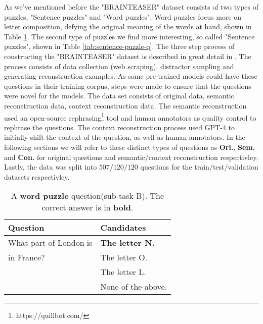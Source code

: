 As we've mentioned before the "BRAINTEASER" dataset consists of two types of puzzles, "Sentence puzzles"
and "Word puzzles".  Word puzzles focus more on letter composition, defying the original meaning
of the words at hand, shown in Table \ref{tab:word-puzzle-q}.
The second type of puzzles we find more interesting, so called "Sentence puzzles", shown in Table
\ref{tab:sentence-puzzle-q}. The three step process of constructing the "BRAINTEASER" dataset
is described in great detail in \citep{semeval}. The process consists of data collection
(web scraping),
distractor sampling and generating reconstruction examples. As some pre-trained models could have
these questions in their training corpus, steps were made to ensure that the questions were novel
for the models.  The data set consists of original data, semantic reconstruction data, context
reconstruction data. The semantic reconstruction used an open-source rephrasing\footnote[2]{https://quillbot.com/} tool and
human annotators as quality control to rephrase the questions. The context reconstruction process
used GPT-4 to initially shift the context of the question, as well as human annotators. In the
following sections we will refer to these distinct types of questions as \textbf{Ori.},
\textbf{Sem.} and
\textbf{Con.} for original questions and semantic/context reconstruction respectivley. Lastly, the
data was split into $507/120/120$ questions for the train/test/validation datasets respectivley.

\begin{table}
	\caption{A \textbf{word puzzle} question(sub-task B). The correct answer is in \textbf{bold}.}
	\label{tab:word-puzzle-q}
	\begin{center}
		\begin{tabular}{p{3.5cm}|p{3.5cm}}
			\toprule
			Question               & Candidates             \\
			\midrule
			What part of London is & \textbf{The letter N.} \\
			in France?             & The letter O.          \\
			                       & The letter L.          \\
			                       & None of the above.     \\
			\bottomrule
		\end{tabular}
	\end{center}
\end{table}

